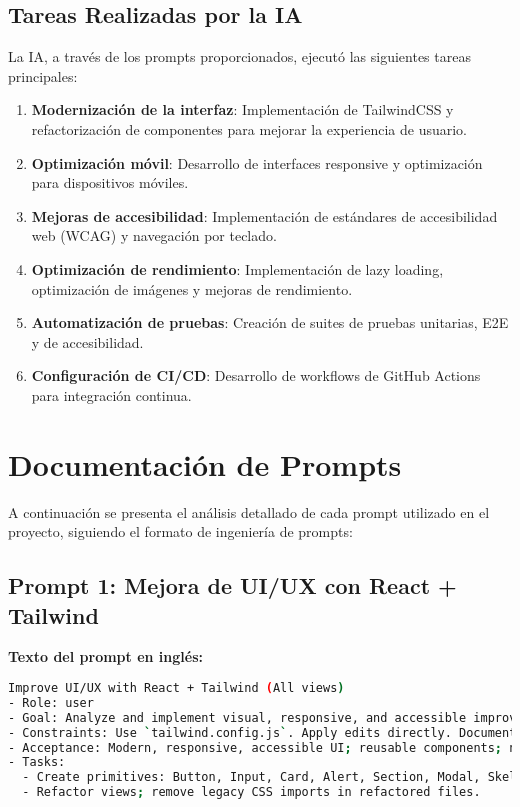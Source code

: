 \documentclass[12pt,a4paper]{article}
\begin{document}
\subsection{Tareas Realizadas por la IA}

La IA, a través de los prompts proporcionados, ejecutó las siguientes tareas principales:

\begin{enumerate}
    \item \textbf{Modernización de la interfaz}: Implementación de TailwindCSS y refactorización de componentes para mejorar la experiencia de usuario.
    
    \item \textbf{Optimización móvil}: Desarrollo de interfaces responsive y optimización para dispositivos móviles.
    
    \item \textbf{Mejoras de accesibilidad}: Implementación de estándares de accesibilidad web (WCAG) y navegación por teclado.
    
    \item \textbf{Optimización de rendimiento}: Implementación de lazy loading, optimización de imágenes y mejoras de rendimiento.
    
    \item \textbf{Automatización de pruebas}: Creación de suites de pruebas unitarias, E2E y de accesibilidad.
    
    \item \textbf{Configuración de CI/CD}: Desarrollo de workflows de GitHub Actions para integración continua.
\end{enumerate}

\section{Documentación de Prompts}

A continuación se presenta el análisis detallado de cada prompt utilizado en el proyecto, siguiendo el formato de ingeniería de prompts:

\subsection{Prompt 1: Mejora de UI/UX con React + Tailwind}

\textbf{Texto del prompt en inglés:}
\begin{lstlisting}[language=bash]
Improve UI/UX with React + Tailwind (All views)
- Role: user
- Goal: Analyze and implement visual, responsive, and accessible improvements across Dashboard, Game, Auth, Lobby, Summary, Admin, Home, Profile; refactor with reusable components.
- Constraints: Use `tailwind.config.js`. Apply edits directly. Document changes. Start with Dashboard.
- Acceptance: Modern, responsive, accessible UI; reusable components; no broken flows.
- Tasks:
  - Create primitives: Button, Input, Card, Alert, Section, Modal, Skeleton, Spinner.
  - Refactor views; remove legacy CSS imports in refactored files.
\end{lstlisting}
\end{document}
